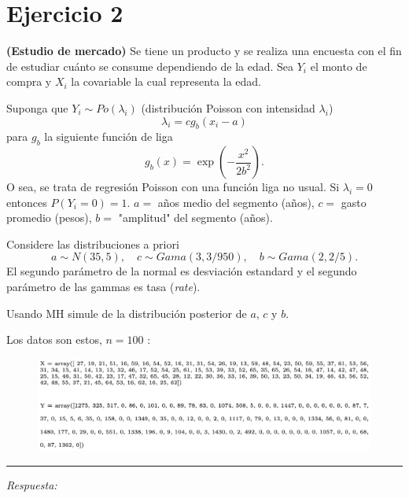 \newpage
\section{Ejercicio 2}
\textbf{(Estudio de mercado)} Se tiene un producto y se realiza una encuesta con el fin de estudiar cuánto se consume dependiendo de la edad. Sea $Y_{i}$ el monto de compra y $X_{i}$ la covariable la cual representa la edad.
	
Suponga que $Y_{i} \sim Po \left(\lambda_{i}\right)$ (distribución Poisson con intensidad $ \lambda_{i}$)
\begin{equation} \label{eq:15}
	\lambda_{i}=c g_{b}\left(x_{i}-a\right)
\end{equation}
para $g_{b}$ la siguiente función de liga
\begin{equation} \label{eq:16}
	g_{b}(x)=\exp \left(-\frac{x^{2}}{2 b^{2}}\right).
\end{equation}
O sea, se trata de regresión Poisson con una función liga no usual. Si $\lambda_{i}=0$ entonces $P \left(Y_{i}=0\right) = 1$. $a=$ años medio del segmento (años), $c =$ gasto promedio (pesos), $b=$ "amplitud" del segmento (años).
	
Considere las distribuciones a priori
\begin{equation} \label{eq:17}
	a \sim N(35,5), \quad c \sim Gama (3,3 / 950), \quad b \sim Gama (2,2 / 5).
\end{equation}
El segundo parámetro de la normal es desviación estandard y el segundo parámetro de las gammas es tasa (\textit{rate}).
	
Usando MH simule de la distribución posterior de $a$, $c$ y $b$.
	
Los datos son estos, $n = 100$ :
	
\begin{figure}[h!]
	\centering
	\includegraphics[width=\textwidth]{IMAGENES/captura}
\end{figure}
	
\vspace{5mm}
{\color{gray} \hrule}
\vspace{5mm}
\textcolor{BrickRed}{\it Respuesta:}

